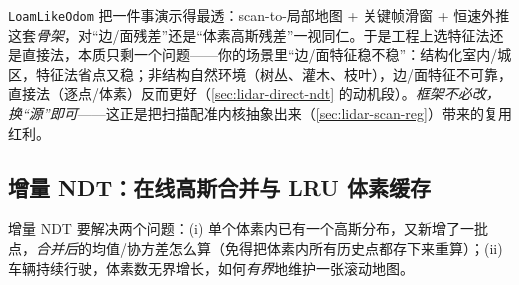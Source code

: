 \begin{insight}\label{ins:lidar-loamlike}
\texttt{LoamLikeOdom} 把一件事演示得最透：scan-to-局部地图 + 关键帧滑窗 + 恒速外推这套\emph{骨架}，对“边/面残差”还是“体素高斯残差”一视同仁。于是工程上选特征法还是直接法，本质只剩一个问题——你的场景里“边/面特征稳不稳”：结构化室内/城区，特征法省点又稳；非结构自然环境（树丛、灌木、枝叶），边/面特征不可靠，直接法（逐点/体素）反而更好（\cref{sec:lidar-direct-ndt} 的动机段）。\emph{框架不必改，换“源”即可}——这正是把扫描配准内核抽象出来（\cref{sec:lidar-scan-reg}）带来的复用红利。
\end{insight}

\subsection{增量 NDT：在线高斯合并与 LRU 体素缓存}
\label{sec:lidar-inc-ndt}

增量 NDT 要解决两个问题\cite{gao2023slamad}：(i) 单个体素内已有一个高斯分布，又新增了一批点，\emph{合并后}的均值/协方差怎么算（免得把体素内所有历史点都存下来重算）；(ii) 车辆持续行驶，体素数无界增长，如何\emph{有界}地维护一张滚动地图。

